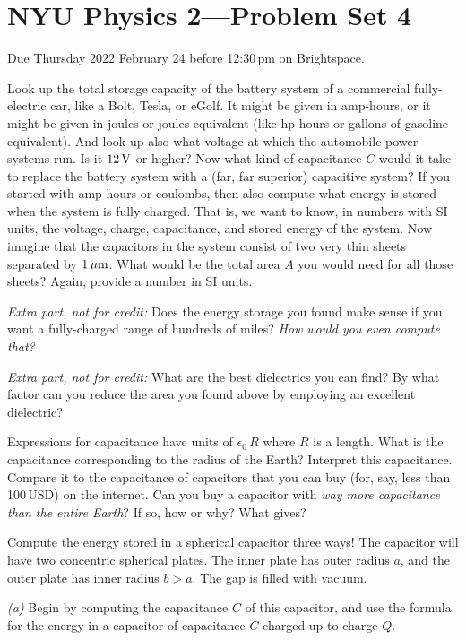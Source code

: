\documentclass[12pt]{article}
\begin{document}
\section*{NYU Physics 2---Problem Set 4}

Due Thursday 2022 February 24 before 12:30\,pm on Brightspace.

\startproblem
Look up the total storage capacity of the battery system of a
commercial fully-electric car, like a Bolt, Tesla, or eGolf. It might
be given in amp-hours, or it might be given in joules or
joules-equivalent (like hp-hours or gallons of gasoline
equivalent). And look up also what voltage at which the automobile
power systems run. Is it $12\,\mathrm{V}$ or higher? Now what kind of
capacitance $C$ would it take to replace the battery system with a
(far, far superior) capacitive system? If you started with amp-hours
or coulombs, then also compute what energy is stored when the system
is fully charged. That is, we want to know, in numbers with SI units, the voltage,
charge, capacitance, and stored energy of the system. Now imagine that
the capacitors in the system consist of two very thin sheets separated
by $1\,\mathrm{\mu m}$.  What would be the total area $A$ you would need for all
those sheets? Again, provide a number in SI units.

\emph{Extra part, not for credit:} Does the energy storage you found
make sense if you want a fully-charged range of hundreds of miles? \emph{How
would you even compute that?}

\emph{Extra part, not for credit:} What are the best dielectrics you can find?
By what factor can you reduce the area you found above by employing an excellent
dielectric?

\startproblem
Expressions for capacitance have units of $\epsilon_0\,R$ where $R$ is a length.
What is the capacitance corresponding to the radius of the Earth?
Interpret this capacitance.
Compare it to the capacitance of capacitors that you can buy (for,
say, less than 100\,USD) on the internet.
Can you buy a capacitor with \emph{way more capacitance than the entire
  Earth}?
If so, how or why? What gives?

\startproblem
Compute the energy stored in a spherical capacitor three ways!
The capacitor will have two concentric spherical plates.
The inner plate has outer radius $a$, and the outer plate has
inner radius $b>a$.
The gap is filled with vacuum.

\textsl{(a)}
Begin by computing the capacitance $C$ of this capacitor, and
use the formula for the energy in a capacitor of capacitance $C$
charged up to charge $Q$.
\end{document}

